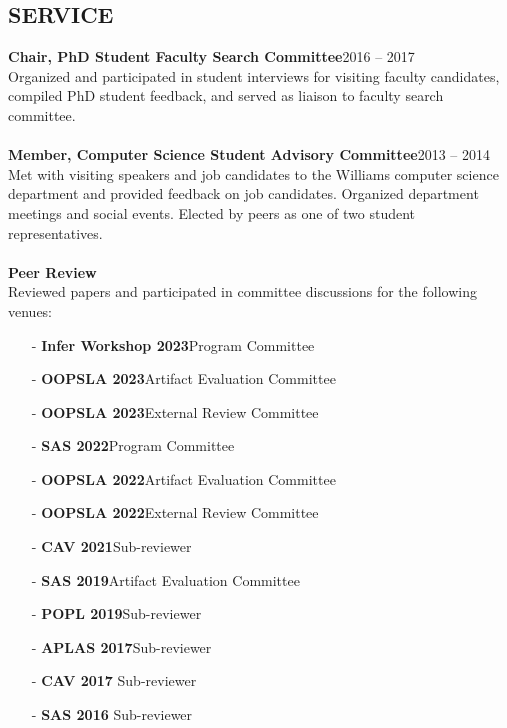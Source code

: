\documentclass[margin,10pt]{res}
\begin{document}
\begin{resume}
\section{SERVICE}
{\bf Chair, PhD Student Faculty Search Committee}\hfill{2016 -- 2017}\\
Organized and participated in student interviews for visiting faculty candidates, compiled PhD student feedback, and served as liaison to faculty search committee.\\\\
{\bf Member, Computer Science Student Advisory Committee}\hfill{2013 -- 2014}\\
Met with visiting speakers and job candidates to the Williams computer science department and provided feedback on job candidates.  Organized department meetings and social events.  Elected by peers as one of two student representatives.\\\\
{\bf Peer Review}\\
Reviewed papers and participated in committee discussions for the following venues:
\begin{itemize}[topsep=0.5em,leftmargin=2em]
\item[-] {\bf Infer Workshop 2023}\hfill Program Committee
\item[-] {\bf OOPSLA 2023}\hfill Artifact Evaluation Committee
\item[-] {\bf OOPSLA 2023}\hfill External Review Committee
\item[-] {\bf SAS 2022}\hfill Program Committee
\item[-] {\bf OOPSLA 2022}\hfill Artifact Evaluation Committee
\item[-] {\bf OOPSLA 2022}\hfill External Review Committee
\item[-] {\bf CAV 2021}\hfill Sub-reviewer
\item[-] {\bf SAS 2019}\hfill Artifact Evaluation Committee
\item[-] {\bf POPL 2019}\hfill Sub-reviewer
\item[-] {\bf APLAS 2017}\hfill Sub-reviewer
\item[-] {\bf CAV 2017} \hfill Sub-reviewer
\item[-] {\bf SAS 2016} \hfill Sub-reviewer
\end{itemize}
\end{resume}
\end{document}
